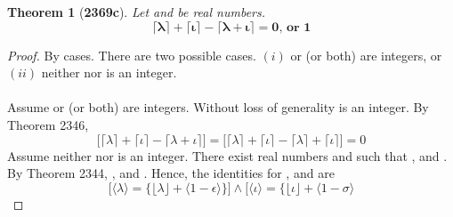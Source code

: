 \documentclass[preview]{standalone}
\newtheorem{theorem}{Theorem}
\begin{document}
\begin{theorem}[\textbf{2369c}]
    Let \bm{$\lambda$} and \bm{$\iota$} be real numbers. 
    \begin{equation*}
        \bm{
            \lceil \lambda \rceil 
                + 
            \lceil \iota \rceil 
                - 
            \lceil \lambda + \iota \rceil 
                = 
            0
                \textbf{, or } 
            1
        }
    \end{equation*}
\end{theorem}

\begin{proof}
    By cases. 
    There are two possible cases. 
    $(i)$ \bm{$\lambda$} or \bm{$\iota$} (or both) are integers, 
    or $(ii)$ neither \bm{$\lambda$} nor \bm{$\iota$} is an integer.
    \\ \\
     Assume \bm{$\lambda$} or \bm{$\iota$} (or both) are integers. 
    Without loss of generality \bm{$\iota$} is an integer.
    By Theorem 2346, 
    \begin{equation*}
        \Big[ 
            \lceil \lambda \rceil 
                + 
            \lceil \iota \rceil 
                - 
            \lceil \lambda + \iota \rceil 
        \Big]
            = 
        \Big[ 
            \lceil \lambda \rceil 
                + 
            \lceil \iota \rceil 
                - 
            \lceil \lambda \rceil 
                + 
            \lceil \iota \rceil 
        \Big]
            = 
        0
    \end{equation*}
     Assume neither \bm{$\lambda$} nor \bm{$\iota$} is an integer. 
    There exist real numbers \bm{$\epsilon$} and \bm{$\sigma$} such that 
    \bm{$\lceil \lambda \rceil - \lambda = \epsilon$},
    and \bm{$\lceil \iota \rceil - \iota = \sigma$}. 
    By Theorem 2344, 
    , 
    and . 
    Hence, the identities for \bm{$\lambda$}, and \bm{$\iota$} are
    \begin{equation*}
        \bigg[
            \Big \langle \lambda \Big \rangle 
                = 
            \Big\{ 
                \lfloor \lambda \rfloor + \big \langle 1 - \epsilon \big \rangle 
            \Big\}
        \bigg]
            \land
        \bigg[ 
            \Big \langle \iota \Big \rangle 
                = 
            \Big\{ 
                \lfloor \iota \rfloor + \big \langle 1 - \sigma \big \rangle

\end{equation*}
\end{proof}
\end{document}

